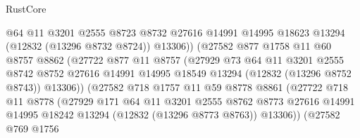 \begin{lexlean}{RustCore}
\begin{coremodule}
                              @64
                              @11
                              @3201
                              @2555
                              @8723
                              @8732
                              @27616
                              @14991
                              @14995
                              @18623
                              @13294
                              (@12832 (@13296 @8732 @8724))
                              @13306))
                          (@27582
                            @877
                            @1758
                            @11
                            @60
                            @8757
                            @8862
                            (@27722
                              @877
                              @11
                              @8757
                              (@27929
                                @73
                                @64
                                @11
                                @3201
                                @2555
                                @8742
                                @8752
                                @27616
                                @14991
                                @14995
                                @18549
                                @13294
                                (@12832 (@13296 @8752 @8743))
                                @13306))
                            (@27582
                              @718
                              @1757
                              @11
                              @59
                              @8778
                              @8861
                              (@27722
                                @718
                                @11
                                @8778
                                (@27929
                                  @171
                                  @64
                                  @11
                                  @3201
                                  @2555
                                  @8762
                                  @8773
                                  @27616
                                  @14991
                                  @14995
                                  @18242
                                  @13294
                                  (@12832 (@13296 @8773 @8763))
                                  @13306))
                              (@27582
                                @769
                                @1756

\end{coremodule}
\end{lexlean}
